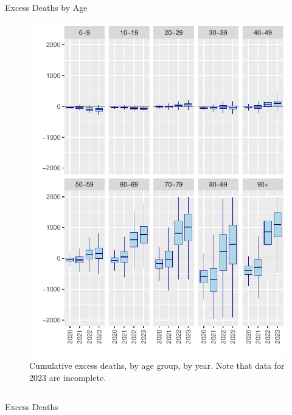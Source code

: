 \documentclass[final]{beamer}
\newlength{\onecolwid}
\newlength{\twocolwid}
\begin{document}
\begin{frame}[t]
\begin{columns}[t]
\begin{column}{\twocolwid}
\begin{columns}[t,totalwidth=\twocolwid]
\begin{column}{\onecolwid}
\begin{block}{Excess Deaths by Age}
\begin{figure}
\includegraphics[width = 0.9 \linewidth]{fig_excess_age}
\caption{Cumulative excess deaths, by age group, by year. Note that data for 2023 are incomplete.}
\end{figure}
\end{block}

\end{column} %

\end{columns} %



\begin{alertblock}{Excess Deaths}


\end{alertblock}
\end{column}
\end{columns}
\end{frame}
\end{document}
